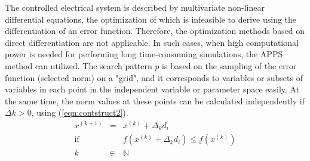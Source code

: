         The controlled electrical system is described by multivariate non-linear differential equations, the optimization of which is infeasible to derive using the differentiation of an error function. Therefore, the optimization methods based on direct differentiation are not applicable. In such cases, when high computational power is needed for performing long time-consuming simulations, the APPS method can utilized. The search pattern $p$ is based on the sampling of the error function (selected norm) on a "grid", and it corresponds to variables or subsets of variables in each point in the independent variable or parameter space easily. At the same time, the norm values at these points can be calculated independently if $\Delta k>0$, using (\ref{eqn:contstruct2}).
        \begin{equation}
        \label{eqn:contstruct2}
        \begin{array}{rcl}
         x^{(k+1)}&=&x^{(k)}+\Delta _kd_i \\
         \mathrm{if}&&f(x^{(k)}+\Delta _kd_i) \leq f(x^{(k)})\\
         k&\in&\mathbb{N}\\
         \end{array}
        \end{equation}

